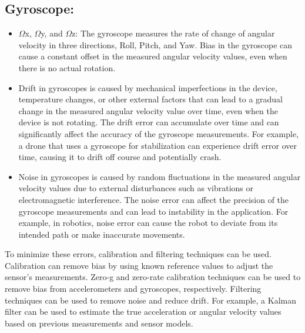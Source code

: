 \subsection{Gyroscope:}
\begin{itemize}
    \item $\Omega$x, $\Omega$y, and $\Omega$z: The gyroscope measures the rate of change of angular velocity in three directions, Roll, Pitch, and Yaw. Bias in the gyroscope can cause a constant offset in the measured angular velocity values, even when there is no actual rotation. \cite{Noureldin:2013}
    \item Drift in gyroscopes is caused by mechanical imperfections in the device, temperature changes, or other external factors that can lead to a gradual change in the measured angular velocity value over time, even when the device is not rotating. The drift error can accumulate over time and can significantly affect the accuracy of the gyroscope measurements. For example, a drone that uses a gyroscope for stabilization can experience drift error over time, causing it to drift off course and potentially crash.
    \item Noise in gyroscopes is caused by random fluctuations in the measured angular velocity values due to external disturbances such as vibrations or electromagnetic interference. The noise error can affect the precision of the gyroscope measurements and can lead to instability in the application. For example, in robotics, noise error can cause the robot to deviate from its intended path or make inaccurate movements.
\end{itemize}

To minimize these errors, calibration and filtering techniques can be used. Calibration can remove bias by using known reference values to adjust the sensor's measurements. Zero-g and zero-rate calibration techniques can be used to remove bias from accelerometers and gyroscopes, respectively. Filtering techniques can be used to remove noise and reduce drift. For example, a Kalman filter can be used to estimate the true acceleration or angular velocity values based on previous measurements and sensor models.\cite{Lin:2005}



